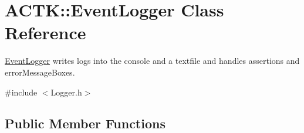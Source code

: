 \hypertarget{class_a_c_t_k_1_1_event_logger}{\section{A\-C\-T\-K\-:\-:Event\-Logger Class Reference}
\label{class_a_c_t_k_1_1_event_logger}
}


\hyperlink{class_a_c_t_k_1_1_event_logger}{Event\-Logger} writes logs into the console and a textfile and handles assertions and error\-Message\-Boxes.  




{\ttfamily \#include $<$Logger.\-h$>$}

\subsection*{Public Member Functions}
